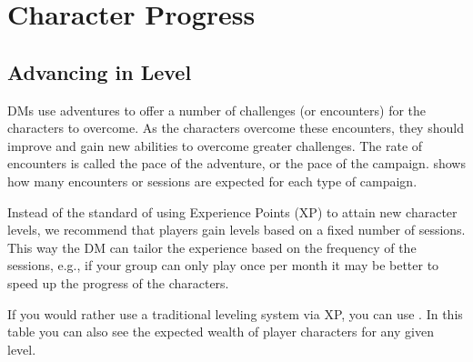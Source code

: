 \section{Character Progress}

\subsection{Advancing in Level}
DMs use adventures to offer a number of challenges (or encounters) for the characters to overcome. As the characters overcome these encounters, they should improve and gain new abilities to overcome greater challenges. The rate of encounters is called the pace of the adventure, or the pace of the campaign.  shows how many encounters or sessions are expected for each type of campaign.


Instead of the standard of using Experience Points (XP) to attain new character levels, we recommend that players gain levels based on a fixed number of sessions. This way the DM can tailor the experience based on the frequency of the sessions, e.g., if your group can only play once per month it may be better to speed up the progress of the characters.

If you would rather use a traditional leveling system via XP, you can use . In this table you can also see the expected wealth of player characters for any given level.

